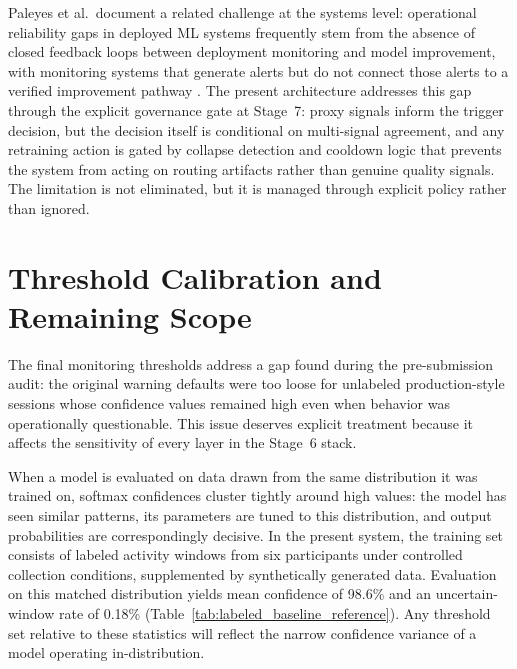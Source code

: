 Paleyes et al.\ document a related challenge at the systems level: operational reliability gaps in deployed ML systems frequently stem from the absence of closed feedback loops between deployment monitoring and model improvement, with monitoring systems that generate alerts but do not connect those alerts to a verified improvement pathway \cite{paleyes2022challenges}. The present architecture addresses this gap through the explicit governance gate at Stage~7: proxy signals inform the trigger decision, but the decision itself is conditional on multi-signal agreement, and any retraining action is gated by collapse detection and cooldown logic that prevents the system from acting on routing artifacts rather than genuine quality signals. The limitation is not eliminated, but it is managed through explicit policy rather than ignored.

\section{Threshold Calibration and Remaining Scope}
\label{sec:threshold_calibration_gap}

The final monitoring thresholds address a gap found during the pre-submission audit: the original warning defaults were too loose for unlabeled production-style sessions whose confidence values remained high even when behavior was operationally questionable. This issue deserves explicit treatment because it affects the sensitivity of every layer in the Stage~6 stack.

When a model is evaluated on data drawn from the same distribution it was trained on, softmax confidences cluster tightly around high values: the model has seen similar patterns, its parameters are tuned to this distribution, and output probabilities are correspondingly decisive. In the present system, the training set consists of labeled activity windows from six participants under controlled collection conditions, supplemented by synthetically generated data. Evaluation on this matched distribution yields mean confidence of 98.6\% and an uncertain-window rate of 0.18\% (Table~\ref{tab:labeled_baseline_reference}). Any threshold set relative to these statistics will reflect the narrow confidence variance of a model operating in-distribution.

